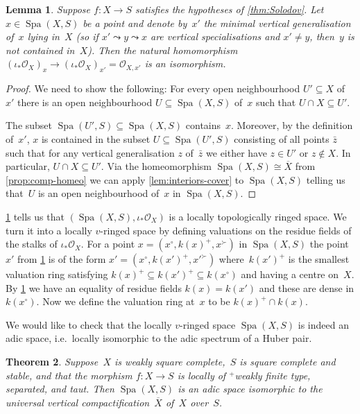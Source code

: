 \documentclass[a4paper,twoside,11pt,reqno]{amsart}
\newcommand{\cO}{{\mathcal O}}
\DeclareMathOperator{\Spa}{Spa}
\newcommand{\ov}[1]{\overline{#1}}
\newtheorem{thm}{Theorem}[subsection]
\newtheorem{lem}[thm]{Lemma}
\theoremstyle{definition}
\numberwithin{equation}{subsection}
\begin{document}
\begin{lem} \label{lem:stalks-comp}
    Suppose $f \colon X \to S$ satisfies the hypotheses of \cref{thm:Solodov}.
    Let $x \in \Spa(X,S)$ be a point and denote by~$x'$ the minimal vertical generalisation of~$x$ lying in~$X$ (so if $x' \leadsto y \leadsto x$ are vertical specialisations and $x' \ne y$, then~$y$ is not contained in~$X$).
    Then the natural homomorphism $(\iota_*\cO_X)_x \to (\iota_*\cO_X)_{x'} = \cO_{X,x'}$ is an isomorphism.
\end{lem}

\begin{proof}
    We need to show the following:
    For every open neighbourhood $U' \subseteq X$ of~$x'$ there is an open neighbourhood $U \subseteq \Spa(X,S)$ of~$x$ such that $U \cap X \subseteq U'$.

    The subset $\Spa(U',S) \subseteq \Spa(X,S)$ contains~$x$.
    Moreover, by the definition of~$x'$, $x$ is contained in the subset $U \subseteq \Spa(U',S)$ consisting of all points $\bar{z}$ such that for any vertical generalisation $z$ of~$\bar{z}$ we either have $z \in U'$ or $z \notin X$.
    In particular, $U \cap X \subseteq U'$.
    Via the homeomorphism $\Spa(X,S) \cong \ov X$ from \cref{prop:comp-homeo} we can apply \cref{lem:interiors-cover} to $\Spa(X,S)$ telling us that~$U$ is an open neighbourhood of~$x$ in $\Spa(X,S)$.
\end{proof}

\cref{lem:stalks-comp} tells us that $(\Spa(X,S),\iota_*\cO_X)$ is a locally topologically ringed space.
We turn it into a locally $v$-ringed space by defining valuations on the residue fields of the stalks of $\iota_*\cO_X$.
For a point $x = (x^\circ,k(x)^+,x^\succ)$ in $\Spa(X,S)$ the point~$x'$ from \cref{lem:stalks-comp} is of the form $x' = (x^\circ,k(x')^+,x'^\succ)$ where~$k(x')^+$ is the smallest valuation ring satisfying $k(x)^+ \subseteq k(x')^+ \subseteq k(x^\circ)$ and having a centre on~$X$.
By \cref{lem:stalks-comp} we have an equality of residue fields $k(x) = k(x')$ and these are dense in $k(x^\circ)$.
Now we define the valuation ring at~$x$ to be $k(x)^+ \cap k(x)$.

We would like to check that the locally $v$-ringed space $\Spa(X,S)$ is indeed an adic space, i.e.~locally isomorphic to the adic spectrum of a Huber pair.

\begin{thm} \label{thm:Solodov-comp}
    Suppose~$X$ is weakly square complete,~$S$ is square complete and stable, and that the morphism $f \colon X \to S$ is locally of ${}^+$weakly finite type, separated, and taut.
    Then $\Spa(X,S)$ is an adic space isomorphic to the universal vertical compactification~$\overline{X}$ of~$X$ over~$S$.
\end{thm}
\end{document}
